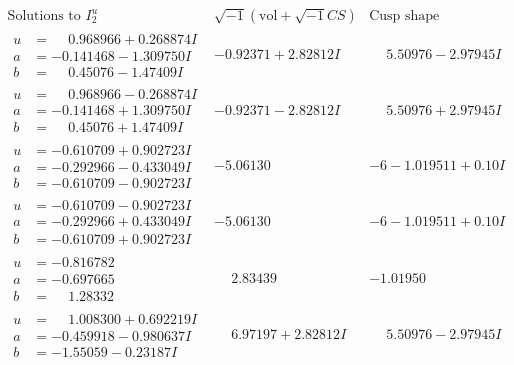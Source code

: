 \documentclass[1p]{elsarticle_modified}
\theoremstyle{definition}
\newcommand{\I}{\sqrt{-1}}
\begin{document}
$$\begin{array}{c|c|c}  
\text{Solutions to }I^u_{2}& \I (\text{vol} + \sqrt{-1}CS) & \text{Cusp shape}\\
 \hline 
\begin{aligned}
u &= \phantom{-}0.968966 + 0.268874 I \\
a &= -0.141468 - 1.309750 I \\
b &= \phantom{-}0.45076 - 1.47409 I\end{aligned}
 & -0.92371 + 2.82812 I & \phantom{-}5.50976 - 2.97945 I \\ \hline\begin{aligned}
u &= \phantom{-}0.968966 - 0.268874 I \\
a &= -0.141468 + 1.309750 I \\
b &= \phantom{-}0.45076 + 1.47409 I\end{aligned}
 & -0.92371 - 2.82812 I & \phantom{-}5.50976 + 2.97945 I \\ \hline\begin{aligned}
u &= -0.610709 + 0.902723 I \\
a &= -0.292966 - 0.433049 I \\
b &= -0.610709 - 0.902723 I\end{aligned}
 & -5.06130\phantom{ +0.000000I} &                  -6
-1.019511 + 0. 10   I\phantom{ +0.000000I} \\ \hline\begin{aligned}
u &= -0.610709 - 0.902723 I \\
a &= -0.292966 + 0.433049 I \\
b &= -0.610709 + 0.902723 I\end{aligned}
 & -5.06130\phantom{ +0.000000I} &                  -6
-1.019511 + 0. 10   I\phantom{ +0.000000I} \\ \hline\begin{aligned}
u &= -0.816782\phantom{ +0.000000I} \\
a &= -0.697665\phantom{ +0.000000I} \\
b &= \phantom{-}1.28332\phantom{ +0.000000I}\end{aligned}
 & \phantom{-}2.83439\phantom{ +0.000000I} & -1.01950\phantom{ +0.000000I} \\ \hline\begin{aligned}
u &= \phantom{-}1.008300 + 0.692219 I \\
a &= -0.459918 - 0.980637 I \\
b &= -1.55059 - 0.23187 I\end{aligned}
 & \phantom{-}6.97197 + 2.82812 I & \phantom{-}5.50976 - 2.97945 I \\ \hline\begin{aligned}

\end{aligned}
\end{array}$$
\end{document}
